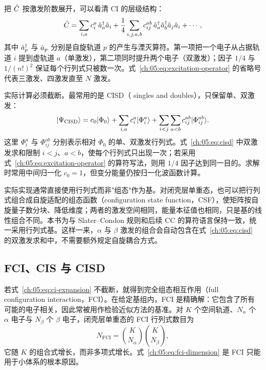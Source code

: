 把 $\hat{C}$ 按激发阶数展开，可以看清 CI 的层级结构：
\begin{equation}
\hat{C}
= \sum_{i,a} c_i^a\,\hat{a}_a^\dagger \hat{a}_i
+ \frac{1}{4}\sum_{i,j,a,b} c_{ij}^{ab}\,
  \hat{a}_a^\dagger \hat{a}_b^\dagger \hat{a}_j \hat{a}_i
+ \cdots ,
\label{ch:05:eq:excitation-operator}
\end{equation}
其中 $\hat{a}_p^\dagger$ 与 $\hat{a}_p$ 分别是自旋轨道 $p$ 的产生与湮灭算符。第一项把一个电子从占据轨道 $i$ 提到虚轨道 $a$（单激发），第二项同时提升两个电子（双激发）；因子 $1/4$ 与 $1/(n!)^2$ 保证每个行列式只被数一次。式~\eqref{ch:05:eq:excitation-operator} 的省略号代表三激发、四激发直至 $N$ 激发。

实际计算必须截断。最常用的是 CISD（ singles and doubles），只保留单、双激发：
\begin{equation}
\lvert \Psi_{\mathrm{CISD}}\rangle
= c_0\lvert \Phi_0\rangle
+ \sum_{i,a} c_i^a \lvert \Phi_i^a\rangle
+ \sum_{i<j}\sum_{a<b} c_{ij}^{ab}\lvert \Phi_{ij}^{ab}\rangle .
\label{ch:05:eq:cisd}
\end{equation}
这里 $\Phi_i^a$ 与 $\Phi_{ij}^{ab}$ 分别表示相对 $\Phi_0$ 的单、双激发行列式。式~\eqref{ch:05:eq:cisd} 中双激发求和限制 $i<j$、$a<b$，使每个行列式只出现一次；若采用式~\eqref{ch:05:eq:excitation-operator} 的算符写法，则用 $1/4$ 因子达到同一目的。求解时常用中间归一化 $c_0=1$，但变分能量仍按归一化波函数计算。

实际实现通常直接使用行列式而非"组态"作为基。对闭壳层单重态，也可以把行列式组合成自旋适配的组态函数（configuration state function，CSF），使矩阵按自旋量子数分块、降低维度；两者的激发空间相同，能量本征值也相同，只是基的线性组合不同。本书为与 Slater--Condon 规则和后续 CC 的算符语言保持一致，统一采用行列式基。这样一来，$\alpha$ 与 $\beta$ 激发的组合会自动包含在式~\eqref{ch:05:eq:cisd} 的双激发求和中，不需要额外规定自旋耦合方式。

\subsection{FCI、CIS 与 CISD}
\label{ch:05:sec:truncation}

若式~\eqref{ch:05:eq:ci-expansion} 不截断，就得到完全组态相互作用（full configuration interaction，FCI）。在给定基组内，FCI 是精确解：它包含了所有可能的电子相关，因此常被用作检验近似方法的基准\citep{knowles1988,shavitt2009}。对 $K$ 个空间轨道、$N_\alpha$ 个 $\alpha$ 电子与 $N_\beta$ 个 $\beta$ 电子，闭壳层单重态的 FCI 行列式数目为
\begin{equation}
N_{\mathrm{FCI}}
= \binom{K}{N_\alpha}\binom{K}{N_\beta},
\label{ch:05:eq:fci-dimension}
\end{equation}
它随 $K$ 的组合式增长，而非多项式增长。式~\eqref{ch:05:eq:fci-dimension} 是 FCI 只能用于小体系的根本原因。

